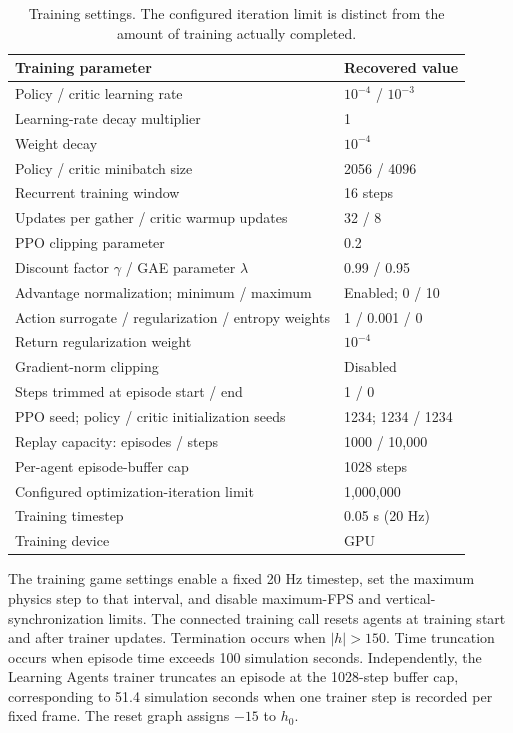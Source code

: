 \begin{table}[H]
  \centering
  \small
  \begin{tabularx}{\linewidth}{@{}Xl@{}}
    \toprule
    \textbf{Training parameter} & \textbf{Recovered value} \\
    \midrule
    Policy / critic learning rate & $10^{-4}$ / $10^{-3}$ \\
    Learning-rate decay multiplier & 1 \\
    Weight decay & $10^{-4}$ \\
    Policy / critic minibatch size & 2056 / 4096 \\
    Recurrent training window & 16 steps \\
    Updates per gather / critic warmup updates & 32 / 8 \\
    PPO clipping parameter & 0.2 \\
    Discount factor $\gamma$ / GAE parameter $\lambda$ & 0.99 / 0.95 \\
    Advantage normalization; minimum / maximum & Enabled; 0 / 10 \\
    Action surrogate / regularization / entropy weights & 1 / 0.001 / 0 \\
    Return regularization weight & $10^{-4}$ \\
    Gradient-norm clipping & Disabled \\
    Steps trimmed at episode start / end & 1 / 0 \\
    PPO seed; policy / critic initialization seeds & 1234; 1234 / 1234 \\
    Replay capacity: episodes / steps & 1000 / 10,000 \\
    Per-agent episode-buffer cap & 1028 steps \\
    Configured optimization-iteration limit & 1,000,000 \\
    Training timestep & 0.05 s (20 Hz) \\
    Training device & GPU \\
    \bottomrule
  \end{tabularx}
  \caption{Training settings. The configured iteration limit is distinct from the amount of training actually completed.}
  \label{tab:ppo-settings}
\end{table}

The training game settings enable a fixed 20 Hz timestep, set the maximum physics step to that interval, and disable maximum-FPS and vertical-synchronization limits. The connected training call resets agents at training start and after trainer updates. Termination occurs when $|h|>150$. Time truncation occurs when episode time exceeds 100 simulation seconds. Independently, the Learning Agents trainer truncates an episode at the 1028-step buffer cap, corresponding to 51.4 simulation seconds when one trainer step is recorded per fixed frame. The reset graph assigns $-15$ to $h_0$.


